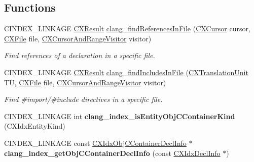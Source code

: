 \subsection*{Functions}
\begin{DoxyCompactItemize}
\item 
C\+I\+N\+D\+E\+X\+\_\+\+L\+I\+N\+K\+A\+GE \hyperlink{group__CINDEX__HIGH_ga59185777d9788da5d983cc0c7c8977bf}{C\+X\+Result} \hyperlink{group__CINDEX__HIGH_gaa8524d179bc3668d215d326d332df97b}{clang\+\_\+find\+References\+In\+File} (\hyperlink{structCXCursor}{C\+X\+Cursor} cursor, \hyperlink{group__CINDEX__FILES_gacfcea9c1239c916597e2e5b3e109215a}{C\+X\+File} file, \hyperlink{structCXCursorAndRangeVisitor}{C\+X\+Cursor\+And\+Range\+Visitor} visitor)
\begin{DoxyCompactList}\small\item\em Find references of a declaration in a specific file. \end{DoxyCompactList}\item 
C\+I\+N\+D\+E\+X\+\_\+\+L\+I\+N\+K\+A\+GE \hyperlink{group__CINDEX__HIGH_ga59185777d9788da5d983cc0c7c8977bf}{C\+X\+Result} \hyperlink{group__CINDEX__HIGH_ga1c3e49cda9a6e2f9c6930881755e0605}{clang\+\_\+find\+Includes\+In\+File} (\hyperlink{group__CINDEX_gacdb7815736ca709ce9a5e1ec2b7e16ac}{C\+X\+Translation\+Unit} TU, \hyperlink{group__CINDEX__FILES_gacfcea9c1239c916597e2e5b3e109215a}{C\+X\+File} file, \hyperlink{structCXCursorAndRangeVisitor}{C\+X\+Cursor\+And\+Range\+Visitor} visitor)
\begin{DoxyCompactList}\small\item\em Find \#import/\#include directives in a specific file. \end{DoxyCompactList}\item 
\mbox{\label{group__CINDEX__HIGH_gacd31bd2c96a08c185a4d6f63d1133649}} 
C\+I\+N\+D\+E\+X\+\_\+\+L\+I\+N\+K\+A\+GE int {\bfseries clang\+\_\+index\+\_\+is\+Entity\+Obj\+C\+Container\+Kind} (C\+X\+Idx\+Entity\+Kind)
\item 
\mbox{\label{group__CINDEX__HIGH_ga78117833cbb1378e373097b4288b8937}} 
C\+I\+N\+D\+E\+X\+\_\+\+L\+I\+N\+K\+A\+GE const \hyperlink{structCXIdxObjCContainerDeclInfo}{C\+X\+Idx\+Obj\+C\+Container\+Decl\+Info} $\ast$ {\bfseries clang\+\_\+index\+\_\+get\+Obj\+C\+Container\+Decl\+Info} (const \hyperlink{structCXIdxDeclInfo}{C\+X\+Idx\+Decl\+Info} $\ast$)
\item 
\mbox{\label{group__CINDEX__HIGH_ga06efe31085488d05c291d2fb4e09edeb}} 

\end{DoxyCompactItemize}
